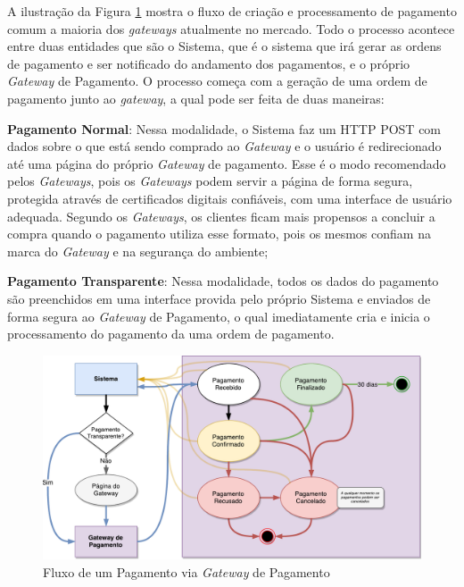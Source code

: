 A ilustração da Figura \ref{fig:gateway} mostra o fluxo de criação e processamento de pagamento comum a maioria dos \emph{gateways} atualmente no mercado. Todo o processo acontece entre duas entidades que são o Sistema, que é o sistema que irá gerar as ordens de pagamento e ser notificado do andamento dos pagamentos, e o próprio \emph{Gateway} de Pagamento. O processo começa com a geração de uma ordem de pagamento junto ao \emph{gateway}, a qual pode ser feita de duas maneiras:

\begin{lista}
	\item \textbf{Pagamento Normal}: Nessa modalidade, o Sistema faz um HTTP POST com dados sobre o que está sendo comprado ao \emph{Gateway} e o usuário é redirecionado até uma página do próprio \emph{Gateway} de pagamento. Esse é o modo recomendado pelos \emph{Gateways}, pois os \emph{Gateways} podem servir a página de forma segura, protegida através de certificados digitais confiáveis, com uma interface de usuário adequada. Segundo os \emph{Gateways}, os clientes ficam mais propensos a concluir a compra quando o pagamento utiliza esse formato, pois os mesmos confiam na marca do \emph{Gateway} e na segurança do ambiente;
	\item \textbf{Pagamento Transparente}: Nessa modalidade, todos os dados do pagamento são preenchidos em uma interface provida pelo próprio Sistema e enviados de forma segura ao \emph{Gateway} de Pagamento, o qual imediatamente cria e inicia o processamento do pagamento da uma ordem de pagamento.
\end{lista}

\begin{figure}[H]
	\caption{\label{fig:gateway}Fluxo de um Pagamento via \emph{Gateway} de Pagamento}
    \centering
    \includegraphics[scale=0.575]{imagens/processo_gateway.pdf}
\end{figure}

